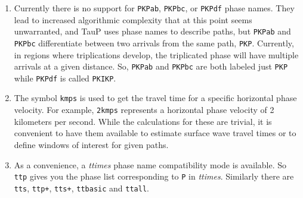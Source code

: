 \begin{enumerate}
\item Currently there is no support for \texttt{PKPab}, \texttt{PKPbc},
or \texttt{PKPdf} phase names.
They lead to increased algorithmic complexity that at this point seems
unwarranted, and TauP uses phase names to describe paths, but
\texttt{PKPab} and \texttt{PKPbc} differentiate between two arrivals from
the same path, \texttt{PKP}.
Currently, in regions where triplications develop, the triplicated phase will have multiple
arrivals at a given distance.
So, \texttt{PKPab} and \texttt{PKPbc} are
both labeled just \texttt{PKP} while \texttt{PKPdf} is called \texttt{PKIKP}.

\item \label{kmps}
The symbol \texttt{kmps} is used to get the travel time for a
specific horizontal phase velocity.
For example, \texttt{2kmps} represents a horizontal phase
velocity of 2 kilometers per second.
While the calculations for these are trivial, it is convenient
to have them available to estimate surface wave travel times or to define windows of
interest for given paths.

\item As a convenience, a \textit{ttimes} phase name compatibility mode is available.
So \texttt{ttp} gives
you the phase list corresponding to \texttt{P} in \textit{ttimes}.
Similarly there are \texttt{tts}, \texttt{ttp+},
\texttt{tts+}, \texttt{ttbasic} and \texttt{ttall}.

\end{enumerate}
